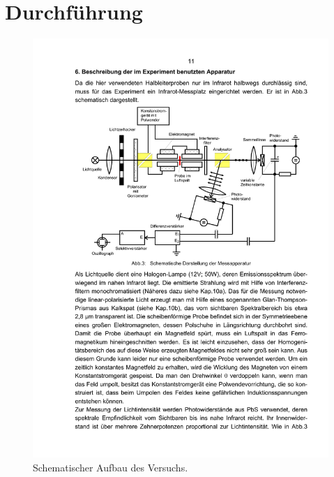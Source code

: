 \section{Durchführung}
\label{sec:Durchführung}

\begin{figure}[H]
    \centering
    \includegraphics[scale=0.8]{Abbildungen/Aufbau.pdf}
    \caption{Schematischer Aufbau des Versuchs.\cite{V46}}
    \label{fig:aufbau}
\end{figure}

